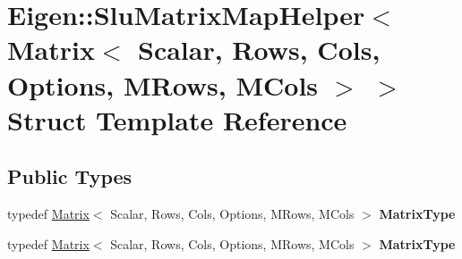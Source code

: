 \hypertarget{struct_eigen_1_1_slu_matrix_map_helper_3_01_matrix_3_01_scalar_00_01_rows_00_01_cols_00_01_optioce31c400c0dc6b34c9e9bbf922bc7aae}{}\section{Eigen\+:\+:Slu\+Matrix\+Map\+Helper$<$ Matrix$<$ Scalar, Rows, Cols, Options, M\+Rows, M\+Cols $>$ $>$ Struct Template Reference}
\label{struct_eigen_1_1_slu_matrix_map_helper_3_01_matrix_3_01_scalar_00_01_rows_00_01_cols_00_01_optioce31c400c0dc6b34c9e9bbf922bc7aae}
\subsection*{Public Types}
\begin{DoxyCompactItemize}
\item 
\mbox{\label{struct_eigen_1_1_slu_matrix_map_helper_3_01_matrix_3_01_scalar_00_01_rows_00_01_cols_00_01_optioce31c400c0dc6b34c9e9bbf922bc7aae_a54655c68633ab3e126220e2f13118ea8}} 
typedef \hyperlink{group___core___module_class_eigen_1_1_matrix}{Matrix}$<$ Scalar, Rows, Cols, Options, M\+Rows, M\+Cols $>$ {\bfseries Matrix\+Type}
\item 
\mbox{\label{struct_eigen_1_1_slu_matrix_map_helper_3_01_matrix_3_01_scalar_00_01_rows_00_01_cols_00_01_optioce31c400c0dc6b34c9e9bbf922bc7aae_a54655c68633ab3e126220e2f13118ea8}} 
typedef \hyperlink{group___core___module_class_eigen_1_1_matrix}{Matrix}$<$ Scalar, Rows, Cols, Options, M\+Rows, M\+Cols $>$ {\bfseries Matrix\+Type}
\end{DoxyCompactItemize}
